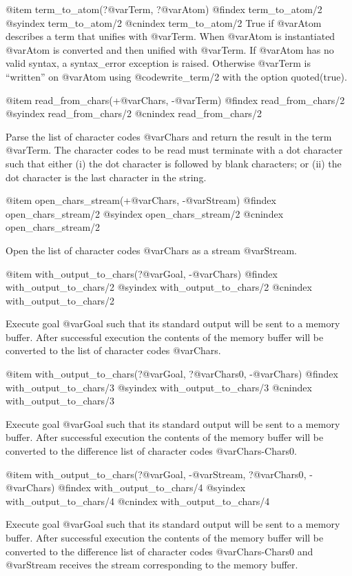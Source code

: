 {{{{{{{{{@item term_to_atom(?@var{Term}, ?@var{Atom})
@findex term_to_atom/2
@syindex term_to_atom/2
@cnindex term_to_atom/2
True if @var{Atom} describes a term that unifies with @var{Term}. When
@var{Atom} is instantiated @var{Atom} is converted and then unified with
@var{Term}. If @var{Atom} has no valid syntax, a syntax_error exception
is raised. Otherwise @var{Term} is ``written'' on @var{Atom} using
@code{write_term/2} with the option quoted(true).

@item read_from_chars(+@var{Chars}, -@var{Term})
@findex read_from_chars/2
@syindex read_from_chars/2
@cnindex read_from_chars/2

Parse the list of character codes @var{Chars} and return the result in
the term @var{Term}. The character codes to be read must terminate with
a dot character such that either (i) the dot character is followed by
blank characters; or (ii) the dot character is the last character in the
string.

@item open_chars_stream(+@var{Chars}, -@var{Stream})
@findex open_chars_stream/2
@syindex open_chars_stream/2
@cnindex open_chars_stream/2

Open the list of character codes @var{Chars} as a stream @var{Stream}.

@item with_output_to_chars(?@var{Goal}, -@var{Chars})
@findex with_output_to_chars/2
@syindex with_output_to_chars/2
@cnindex with_output_to_chars/2

Execute goal @var{Goal} such that its standard output will be sent to a
memory buffer. After successful execution the contents of the memory
buffer will be converted to the list of character codes @var{Chars}.

@item with_output_to_chars(?@var{Goal}, ?@var{Chars0}, -@var{Chars})
@findex with_output_to_chars/3
@syindex with_output_to_chars/3
@cnindex with_output_to_chars/3

Execute goal @var{Goal} such that its standard output will be sent to a
memory buffer. After successful execution the contents of the memory
buffer will be converted to the difference list of character codes
@var{Chars-Chars0}.

@item with_output_to_chars(?@var{Goal}, -@var{Stream}, ?@var{Chars0}, -@var{Chars})
@findex with_output_to_chars/4
@syindex with_output_to_chars/4
@cnindex with_output_to_chars/4

Execute goal @var{Goal} such that its standard output will be sent to a
memory buffer. After successful execution the contents of the memory
buffer will be converted to the difference list of character codes
@var{Chars-Chars0} and @var{Stream} receives the stream corresponding to
the memory buffer.

}}}}}}}}}

